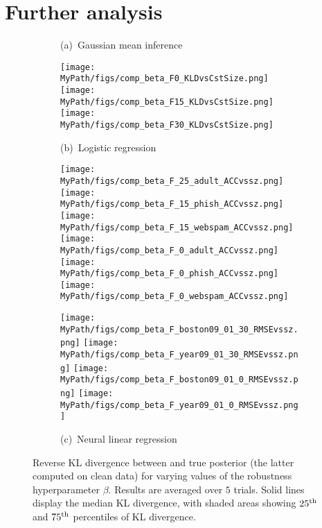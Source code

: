 \section{Further analysis}
\label{sec:sensitivity}

\begin{figure}[!tp]
	\begin{subfigure}[]{0.995\textwidth} 
		\centering
		\caption{(a)~Gaussian mean inference}
		\centering
		\texttt{[image: \\MyPath/figs/comp\_beta\_F0\_KLDvsCstSize.png]}
		\centering
		\hfill
		\texttt{[image: \\MyPath/figs/comp\_beta\_F15\_KLDvsCstSize.png]}
		\centering
		\hfill
		\texttt{[image: \\MyPath/figs/comp\_beta\_F30\_KLDvsCstSize.png]}
		\centering
		\caption{(b)~Logistic regression}
		\centering 
		\hfill
		\texttt{[image: \\MyPath/figs/comp\_beta\_F\_25\_adult\_ACCvssz.png]}
		\centering
		\hfil
		\texttt{[image: \\MyPath/figs/comp\_beta\_F\_15\_phish\_ACCvssz.png]}
		\centering
		\hfill
		\texttt{[image: \\MyPath/figs/comp\_beta\_F\_15\_webspam\_ACCvssz.png]}
		\centering
		\texttt{[image: \\MyPath/figs/comp\_beta\_F\_0\_adult\_ACCvssz.png]}
		\centering
		\hfill
		\texttt{[image: \\MyPath/figs/comp\_beta\_F\_0\_phish\_ACCvssz.png]}
		\centering
		\hfill
		\texttt{[image: \\MyPath/figs/comp\_beta\_F\_0\_webspam\_ACCvssz.png]}
		\centering
		\caption{(c)~Neural linear regression}
		\centering
		\texttt{[image: \\MyPath/figs/comp\_beta\_F\_boston09\_01\_30\_RMSEvssz.png]}
		\centering
		\texttt{[image: \\MyPath/figs/comp\_beta\_F\_year09\_01\_30\_RMSEvssz.png]}
		\centering
		\texttt{[image: \\MyPath/figs/comp\_beta\_F\_boston09\_01\_0\_RMSEvssz.png]}
		\centering
		\texttt{[image: \\MyPath/figs/comp\_beta\_F\_year09\_01\_0\_RMSEvssz.png]}
	\end{subfigure}	
	\centering
	\caption{Reverse KL divergence between \bcores{} and true posterior (the latter computed on clean data) for varying values of the robustness hyperparameter $\beta$. Results are averaged over $5$ trials. Solid lines display the median KL divergence, with shaded areas showing $25\textsuperscript{th}$ and $75\textsuperscript{th}$ percentiles of KL divergence.}
	\label{fig:beta_sens}
\end{figure}

